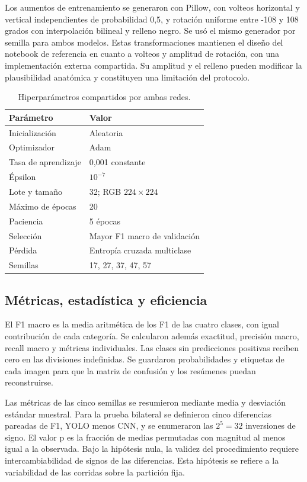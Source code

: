 \documentclass[conference]{IEEEtran}
\begin{document}
Los aumentos de entrenamiento se generaron con Pillow, con volteos horizontal y vertical independientes de probabilidad 0,5, y rotación uniforme entre -108 y 108 grados con interpolación bilineal y relleno negro. Se usó el mismo generador por semilla para ambos modelos. Estas transformaciones mantienen el diseño del notebook de referencia en cuanto a volteos y amplitud de rotación, con una implementación externa compartida. Su amplitud y el relleno pueden modificar la plausibilidad anatómica y constituyen una limitación del protocolo.

\begin{table}[t]
\caption{Hiperparámetros compartidos por ambas redes.}\label{tab:hyper}\centering
\begin{tabular}{ll}\toprule
Parámetro & Valor\\\midrule
Inicialización & Aleatoria\\
Optimizador & Adam\\
Tasa de aprendizaje & 0,001 constante\\
Épsilon & $10^{-7}$\\
Lote y tamaño & 32; RGB $224\times224$\\
Máximo de épocas & 20\\
Paciencia & 5 épocas\\
Selección & Mayor F1 macro de validación\\
Pérdida & Entropía cruzada multiclase\\
Semillas & 17, 27, 37, 47, 57\\\bottomrule
\end{tabular}
\end{table}
\subsection{Métricas, estadística y eficiencia}
El F1 macro es la media aritmética de los F1 de las cuatro clases, con igual contribución de cada categoría. Se calcularon además exactitud, precisión macro, recall macro y métricas individuales. Las clases sin predicciones positivas reciben cero en las divisiones indefinidas. Se guardaron probabilidades y etiquetas de cada imagen para que la matriz de confusión y los resúmenes puedan reconstruirse.

Las métricas de las cinco semillas se resumieron mediante media y desviación estándar muestral. Para la prueba bilateral se definieron cinco diferencias pareadas de F1, YOLO menos CNN, y se enumeraron las $2^5=32$ inversiones de signo. El valor p es la fracción de medias permutadas con magnitud al menos igual a la observada. Bajo la hipótesis nula, la validez del procedimiento requiere intercambiabilidad de signos de las diferencias. Esta hipótesis se refiere a la variabilidad de las corridas sobre la partición fija.
\end{document}

